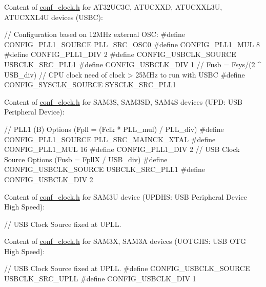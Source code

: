 Content of \hyperlink{conf__clock_8h}{conf\-\_\-clock.\-h} for A\-T32\-U\-C3\-C, A\-T\-U\-C\-X\-X\-D, A\-T\-U\-C\-X\-X\-L3\-U, A\-T\-U\-C\-X\-X\-L4\-U devices (U\-S\-B\-C)\-: 
\begin{DoxyCode}
        \textcolor{comment}{// Configuration based on 12MHz external OSC:}
\textcolor{preprocessor}{        #define CONFIG\_PLL1\_SOURCE          PLL\_SRC\_OSC0}
\textcolor{preprocessor}{}\textcolor{preprocessor}{        #define CONFIG\_PLL1\_MUL             8}
\textcolor{preprocessor}{}\textcolor{preprocessor}{        #define CONFIG\_PLL1\_DIV             2}
\textcolor{preprocessor}{}\textcolor{preprocessor}{        #define CONFIG\_USBCLK\_SOURCE        USBCLK\_SRC\_PLL1}
\textcolor{preprocessor}{}\textcolor{preprocessor}{        #define CONFIG\_USBCLK\_DIV           1 // Fusb = Fsys/(2 ^ USB\_div)}
\textcolor{preprocessor}{}        \textcolor{comment}{// CPU clock need of clock > 25MHz to run with USBC}
\textcolor{preprocessor}{        #define CONFIG\_SYSCLK\_SOURCE        SYSCLK\_SRC\_PLL1}
\end{DoxyCode}


Content of \hyperlink{conf__clock_8h}{conf\-\_\-clock.\-h} for S\-A\-M3\-S, S\-A\-M3\-S\-D, S\-A\-M4\-S devices (U\-P\-D\-: U\-S\-B Peripheral Device)\-: 
\begin{DoxyCode}
        \textcolor{comment}{// PLL1 (B) Options   (Fpll = (Fclk * PLL\_mul) / PLL\_div)}
\textcolor{preprocessor}{        #define CONFIG\_PLL1\_SOURCE          PLL\_SRC\_MAINCK\_XTAL}
\textcolor{preprocessor}{}\textcolor{preprocessor}{        #define CONFIG\_PLL1\_MUL             16}
\textcolor{preprocessor}{}\textcolor{preprocessor}{        #define CONFIG\_PLL1\_DIV             2}
\textcolor{preprocessor}{}        \textcolor{comment}{// USB Clock Source Options   (Fusb = FpllX / USB\_div)}
\textcolor{preprocessor}{        #define CONFIG\_USBCLK\_SOURCE        USBCLK\_SRC\_PLL1}
\textcolor{preprocessor}{        #define CONFIG\_USBCLK\_DIV           2}
\end{DoxyCode}


Content of \hyperlink{conf__clock_8h}{conf\-\_\-clock.\-h} for S\-A\-M3\-U device (U\-P\-D\-H\-S\-: U\-S\-B Peripheral Device High Speed)\-: 
\begin{DoxyCode}
        \textcolor{comment}{// USB Clock Source fixed at UPLL.}
\end{DoxyCode}


Content of \hyperlink{conf__clock_8h}{conf\-\_\-clock.\-h} for S\-A\-M3\-X, S\-A\-M3\-A devices (U\-O\-T\-G\-H\-S\-: U\-S\-B O\-T\-G High Speed)\-: 
\begin{DoxyCode}
        \textcolor{comment}{// USB Clock Source fixed at UPLL.}
\textcolor{preprocessor}{        #define CONFIG\_USBCLK\_SOURCE        USBCLK\_SRC\_UPLL}
\textcolor{preprocessor}{        #define CONFIG\_USBCLK\_DIV           1}
\end{DoxyCode}


